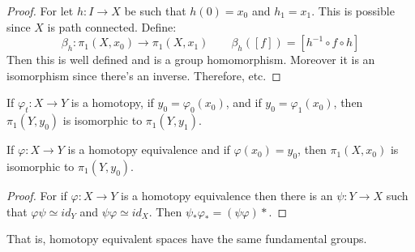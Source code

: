 \documentclass[crop=false,class=book,oneside]{standalone}
\begin{document}
            \begin{proof}
                For let $h:I\rightarrow{X}$ be such that
                $h(0)=x_{0}$ and $h_{1}=x_{1}$. This is possible
                since $X$ is path connected. Define:
                \begin{equation}
                    \beta_{h}:\pi_{1}(X,x_{0})\rightarrow
                    \pi_{1}(X,x_{1})\quad\quad
                    \beta_{h}([f])=[h^{\minus{1}}\circ{f}\circ{h}]
                \end{equation}
                Then this is well defined and is a group homomorphism.
                Moreover it is an isomorphism since there's an
                inverse. Therefore, etc.
            \end{proof}
            \begin{theorem}
                If $\varphi_{t}:X\rightarrow{Y}$ is a homotopy,
                if $y_{0}=\varphi_{0}(x_{0})$, and if
                $y_{0}=\varphi_{1}(x_{0})$, then
                $\pi_{1}(Y,y_{0})$ is isomorphic to
                $\pi_{1}(Y,y_{1})$.
            \end{theorem}
            \begin{theorem}
                If $\varphi:X\rightarrow{Y}$ is a homotopy
                equivalence and if $\varphi(x_{0})=y_{0}$, then
                $\pi_{1}(X,x_{0})$ is isomorphic to
                $\pi_{1}(Y,y_{0})$.
            \end{theorem}
            \begin{proof}
                For if $\varphi:X\rightarrow{Y}$ is a homotopy
                equivalence then there is an
                $\psi:Y\rightarrow{X}$ such that
                $\varphi\psi\simeq id_{Y}$ and
                $\psi\varphi\simeq id_{X}$. Then
                $\psi_{*}\varphi_{*}=(\psi\varphi){*}$.
            \end{proof}
            That is, homotopy equivalent spaces have the same
            fundamental groups.
\end{document}
